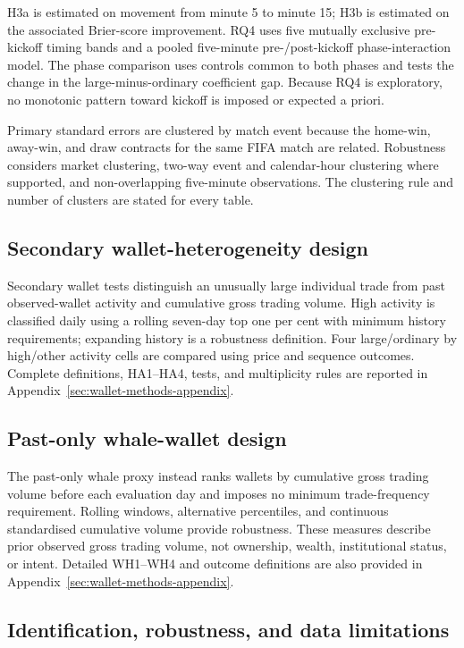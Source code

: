 H3a is estimated on movement from minute 5 to minute 15; H3b is estimated on the associated Brier-score improvement. RQ4 uses five mutually exclusive pre-kickoff timing bands and a pooled five-minute pre-/post-kickoff phase-interaction model. The phase comparison uses controls common to both phases and tests the change in the large-minus-ordinary coefficient gap. Because RQ4 is exploratory, no monotonic pattern toward kickoff is imposed or expected a priori.

Primary standard errors are clustered by match event because the home-win, away-win, and draw contracts for the same FIFA match are related. Robustness considers market clustering, two-way event and calendar-hour clustering where supported, and non-overlapping five-minute observations. The clustering rule and number of clusters are stated for every table.

\subsection{Secondary wallet-heterogeneity design}
\label{sec:wallet-heterogeneity-design}

Secondary wallet tests distinguish an unusually large individual trade from
past observed-wallet activity and cumulative gross trading volume. High activity
is classified daily using a rolling seven-day top one per cent with minimum
history requirements; expanding history is a robustness definition. Four
large/ordinary by high/other activity cells are compared using price and
sequence outcomes. Complete definitions, HA1--HA4, tests, and multiplicity rules
are reported in Appendix~\ref{sec:wallet-methods-appendix}.

\subsection{Past-only whale-wallet design}
\label{sec:whale-wallet-design}

The past-only whale proxy instead ranks wallets by cumulative gross trading volume before
each evaluation day and imposes no minimum trade-frequency requirement. Rolling
windows, alternative percentiles, and continuous standardised cumulative volume
provide robustness. These measures describe prior observed gross trading volume,
not ownership, wealth, institutional status, or intent. Detailed WH1--WH4 and
outcome definitions are also provided in Appendix~\ref{sec:wallet-methods-appendix}.

\subsection{Identification, robustness, and data limitations}


